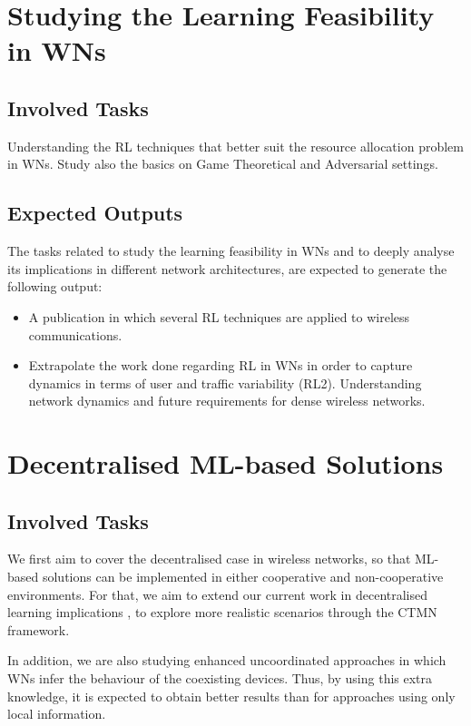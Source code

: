 \documentclass[12pt, a4paper,twoside]{tesi_upf}
\begin{document}
		\section{Studying the Learning Feasibility in WNs}
		\label{section:contribution2}
			\subsection{Involved Tasks}
				Understanding the RL techniques that better suit the resource allocation problem in WNs. Study also the basics on Game Theoretical and Adversarial settings.				
			\subsection{Expected Outputs}
				The tasks related to study the learning feasibility in WNs and to deeply analyse its implications in different network architectures, are expected to generate the following output:
				\begin{itemize}
					\item A publication in which several RL techniques are applied to wireless communications.				
					\item Extrapolate the work done regarding RL in WNs in order to capture dynamics in terms of user and traffic variability (RL2). Understanding network dynamics and future requirements for dense wireless networks.
				\end{itemize}
		
		\section{Decentralised ML-based Solutions}
		\label{section:contribution3}	
			\subsection{Involved Tasks}		
					We first aim to cover the decentralised case in wireless networks, so that ML-based solutions can be implemented in either cooperative and non-cooperative environments.  For that, we aim to extend our current work in decentralised learning implications \cite{wilhelmi2017implications, wilhelmi2017enhancing}, to explore more realistic scenarios through the CTMN framework. 
					
					In addition, we are also studying enhanced uncoordinated approaches in which WNs infer the behaviour of the coexisting devices. Thus, by using this extra knowledge, it is expected to obtain better results than for approaches using only local information. 
					
\end{document}
